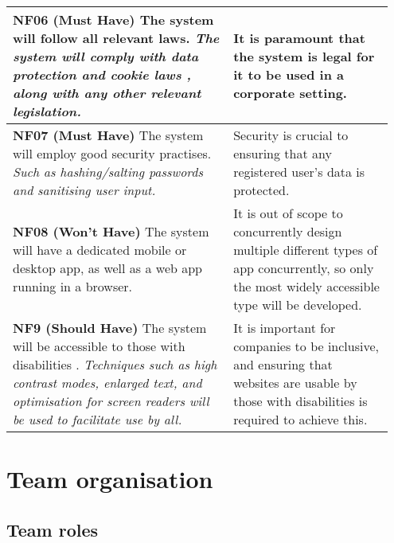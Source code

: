 \documentclass[10pt]{article}
\begin{document}
\begin{longtable}{|p{0.55\linewidth}|p{0.4\linewidth}|}
    \textbf{NF06 (Must Have) }
    The system will follow all relevant laws.
    \textit{The system will comply with data protection \cite{data_protection}
    and cookie laws \cite{cookie_law}, along with any other relevant
    legislation.}
        &
    It is paramount that the system is legal for it to be used in a corporate
    setting.
    \\ \hline

    \textbf{NF07 (Must Have) }
    The system will employ good security practises.
    \textit{Such as hashing/salting passwords and sanitising user input.}
        &
    Security is crucial to ensuring that any registered user's data is
    protected.
    \\ \hline

    \textbf{NF08 (Won't Have) }
    The system will have a dedicated mobile or desktop app, as well as a web app
    running in a browser.
        &
    It is out of scope to concurrently design multiple different types of app
    concurrently, so only the most widely accessible type will be developed.
    \\ \hline

    \textbf{NF9 (Should Have) }
    The system will be accessible to those with disabilities \cite{accessibility}.
    \textit{Techniques such as high contrast modes, enlarged text, and
    optimisation for screen readers will be used to facilitate use by all.}
        &
    It is important for companies to be inclusive, and ensuring that websites
    are usable by those with disabilities is required to achieve this.
    \\ \hline

\end{longtable}

\vspace{-4mm}\section{Team organisation}\vspace{-2mm}
\subsection{Team roles}\vspace{-2mm}
\end{document}
